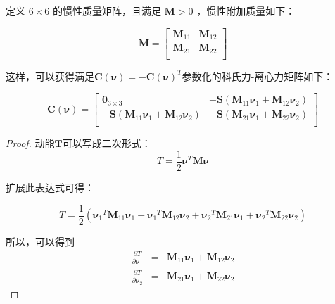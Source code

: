 \begin{thm}
\label{app_A:thm:1}
定义 $6 \times 6$ 的惯性质量矩阵，且满足 $\bm{M} > 0$ ，惯性附加质量如下：

\begin{equation}
\label{eq:app:1}
\bm{M} = \begin{bmatrix}
		 \bm{M}_{11}   &  \bm{M}_{12}   \\
		 \bm{M}_{21}   &  \bm{M}_{22}   \\
		 \end{bmatrix}
\end{equation}

这样，可以获得满足$\bm{C}({\bm{\nu}}) = - \bm{C}({\bm{\nu}}) ^T$参数化的科氏力-离心力矩阵如下：

\begin{equation}
\label{eq:app:2}
\bm{C}({\bm{\nu}}) =   \begin{bmatrix}
                \bm{0}_{3 \times 3}      &  -\bm{S}( \bm{M}_{11} \bm{\nu}_{1} + \bm{M}_{12} \bm{\nu}_{2})      \\
    -\bm{S}(\bm{M}_{11}\bm{\nu}_{1}+\bm{M}_{12}\bm{\nu}_{2})   &  -\bm{S}(\bm{M}_{21}\bm{\nu}_{1}+\bm{M}_{22}\bm{\nu}_{2}) \\
					   \end{bmatrix}
\end{equation}
\begin{proof}

动能$\bm{T}$可以写成二次形式：
\begin{equation}
\label{eq:app:3}
{T} = \frac{1}{2} \bm{\nu}^T\bm{M}\bm{\nu}
\end{equation}

扩展此表达式可得：

\begin{equation}
\label{eq:app:4}
T = \frac{1}{2} ({\bm{\nu}_1 }^T \bm{M}_{11} \bm{\nu}_{1} + {\bm{\nu}_1 }^T \bm{M}_{12} \bm{\nu}_2 + {\bm{\nu}_2}^T \bm{M}_{21} \bm{\nu}_{1} + {\bm{\nu}_2}^T \bm{M}_{22} \bm{\nu}_2)
\end{equation}

所以，可以得到
\begin{eqnarray}
\label{eq:app:5}
\frac{\partial T}{\partial \bm{\nu}_1 } &=& \bm{M}_{11} \bm{\nu}_1 + \bm{M}_{12} \bm{\nu}_{2} \\
\label{eq:app:6}
\frac{\partial T}{ \partial \bm{\nu}_2} &=&  \bm{M}_{21} \bm{\nu}_{1} + \bm{M}_{22} \bm{\nu}_{2}
\end{eqnarray}


\end{proof}
\end{thm}
